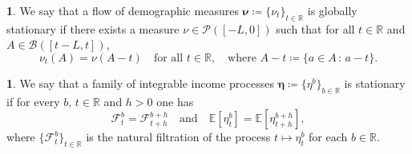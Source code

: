 \documentclass[11pt,oneside,english,reqno,dvipsnames,table]{amsart}
\numberwithin{equation}{section}
\theoremstyle{plain}
\theoremstyle{definition}
\newtheorem{defn}[thm]{\protect\definitionname}
\theoremstyle{remark}
\theoremstyle{plain}
\newtheorem{lem}[thm]{\protect\lemmaname}
\theoremstyle{plain}
\theoremstyle{plain}
\theoremstyle{plain}
\theoremstyle{plain}
\theoremstyle{plain}
\theoremstyle{plain}
\providecommand{\definitionname}{Definition}
\providecommand{\lemmaname}{Lemma}
\newcommand{\red}[1]{#1}
\newcommand{\EE}{\mathbb{E}}
\newcommand{\dd}{\mathop{}\!\mathrm{d}}
\newcommand{\mcB}{\mathcal{B}}
\newcommand{\mcF}{\mathcal{F}}
\newcommand{\mcL}{\mathcal{L}}
\newcommand{\mcP}{\mathcal{P}}
\newcommand{\mbE}{\mathbb{E}}
\newcommand{\mbN}{\mathbb{N}}
\newcommand{\mbR}{\mathbb{R}}
\newcommand{\bmeta}{\boldsymbol{\eta}}
\newcommand{\bnu}{\boldsymbol{\nu}}
\numberwithin{thm}{section}
\begin{document}
\begin{defn}\label{def:stat_demographic}
     We say that a flow of demographic measures $\bnu \coloneqq \{\nu_t\}_{t\in \mbR}$ is globally stationary if there exists a measure $\nu \in \mcP([-L,0])$ such that for all $t\in \mbR$ and $A \in \mcB([t-L,t])$,
    \begin{equation*}
       \nu_t (A)= \nu(A-t) \quad \text{for all}\,\, t\in \mbR, \quad \text{where}\,\, A-t \coloneqq \{a \in A\,:\, a-t\}.
    \end{equation*}
\end{defn}
%
\begin{defn}\label{def:stat_income}
    We say that a family of integrable income processes $\bmeta \coloneqq \{\eta^b\}_{b\in \mbR}$ is stationary if for every $b,\, t\in \mbR$ and $h>0$ one has
    \begin{equation*}
        \mcF^b_t = \mcF^{b+h}_{t+h}\quad \text{and} \quad \EE[\eta^b_t] = \EE[\eta^{b+h}_{t+h}], 
    \end{equation*}
    where $\{\mcF^b_t\}_{t\in \mbR}$ is the natural filtration of the process $t\mapsto \eta^b_t$ for each $b\in \mbR$. %
\end{defn}
%
%
%
%
\end{document}
